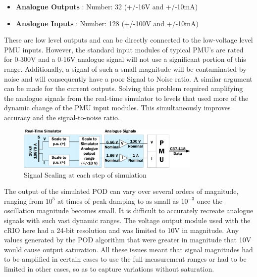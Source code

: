 \documentclass[journal]{IEEEtran}
\begin{document}
\begin{itemize}
\item \textbf{Analogue Outputs} : Number: 32 (+/-16V and +/-10mA)
\item \textbf{Analogue Inputs} : Number: 128 (+/-100V and +/-10mA)
\end{itemize}

These are low level outputs and can be directly connected to the low-voltage level PMU inputs. However, the standard input modules of typical PMU's are rated for 0-300V and a 0-16V analogue signal will not use a significant portion of this range. Additionally, a signal of such a small magnitude will be contaminated by noise and will consequently have a poor Signal to Noise ratio. A similar argument can be made for the current outputs. Solving this problem required amplifying the analogue signals from the real-time simulator to levels that used more of the dynamic change of the PMU input modules. This simultaneously improves accuracy and the signal-to-noise ratio.

\begin{figure}[!th]
\centering
\includegraphics[width=3.5in]{Scaling.png}
\caption{Signal Scaling at each step of simulation}
\label{ScalingProblem}
\end{figure}

The output of the simulated POD can vary over several orders of magnitude, ranging from $10^{5}$ at times of peak damping to as small as $10^{-3}$ once the oscillation magnitude  becomes small. It is difficult to accurately recreate analogue signals with such vast dynamic ranges. The voltage output module used with the cRIO here had a 24-bit resolution and was limited to 10V in magnitude. Any values generated by the POD algorithm that were greater in magnitude that 10V would cause output saturation. All these issues meant that signal magnitudes had to be amplified in certain cases to use the full measurement ranges or had to be limited in other cases, so as to capture variations without saturation.
\end{document}
